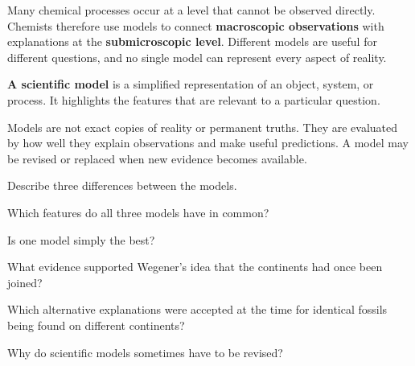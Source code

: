 Many chemical processes occur at a level that cannot be observed directly. Chemists therefore use models to connect \textbf{macroscopic observations} with explanations at the \textbf{submicroscopic level}. Different models are useful for different questions, and no single model can represent every aspect of reality.

\begin{InfoBox}
\textbf{A scientific model} is a simplified representation of an object, system, or process. It highlights the features that are relevant to a particular question.
\end{InfoBox}

Models are not exact copies of reality or permanent truths. They are evaluated by how well they explain observations and make useful predictions. A model may be revised or replaced when new evidence becomes available.


\CarModelsFigure

\begin{ExerciseParts}
  \item Describe three differences between the models.
  \ResponseGap
  \item Which features do all three models have in common?
  \ResponseGap
  \item Is one model simply the best?
  \ResponseGap
\end{ExerciseParts}


\begin{ExerciseParts}
    \item What evidence supported Wegener’s idea that the continents had once been joined?
    \ResponseGap
    \item Which alternative explanations were accepted at the time for identical fossils being found on different continents?
    \ResponseGap
    \item Why do scientific models sometimes have to be revised?
    \ResponseGap
\end{ExerciseParts}


